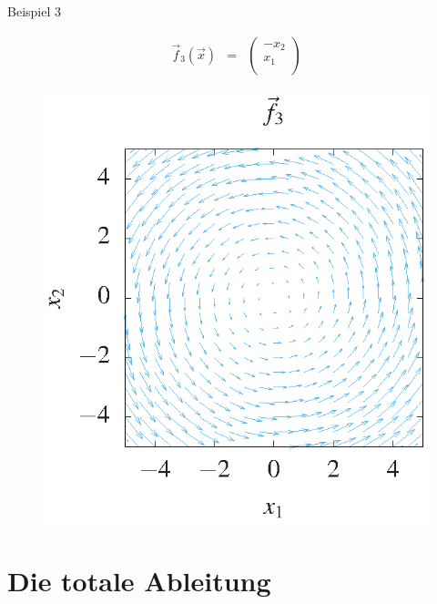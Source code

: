 \documentclass[german]{beamer}
\newcommand{\bq}{\begin{eqnarray*}}
\newcommand{\eq}{\end{eqnarray*}}
\begin{document}
\begin{frame}{Beispiel 3}

\bq
 \vec{f}_3(\vec{x}) & = & \left( \begin{array}{c} -x_2 \\ x_1 \\ \end{array} \right)
\eq
\begin{figure}
\includegraphics[scale=0.7]{f3}
\end{figure}

\end{frame}


\section{Die totale Ableitung}
\end{document}
